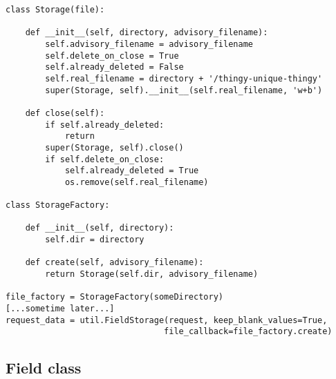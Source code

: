 \begin{description}
\begin{verbatim}
class Storage(file):

    def __init__(self, directory, advisory_filename):
        self.advisory_filename = advisory_filename
        self.delete_on_close = True
        self.already_deleted = False
        self.real_filename = directory + '/thingy-unique-thingy'
        super(Storage, self).__init__(self.real_filename, 'w+b')

    def close(self):
        if self.already_deleted:
            return
        super(Storage, self).close()
        if self.delete_on_close:
            self.already_deleted = True
            os.remove(self.real_filename)

class StorageFactory:

    def __init__(self, directory):
        self.dir = directory

    def create(self, advisory_filename):
        return Storage(self.dir, advisory_filename)

file_factory = StorageFactory(someDirectory)
[...sometime later...]
request_data = util.FieldStorage(request, keep_blank_values=True,
                                file_callback=file_factory.create)
\end{verbatim}

\end{description}


\subsection{Field class\label{pyapi-util-fstor-fld}}

